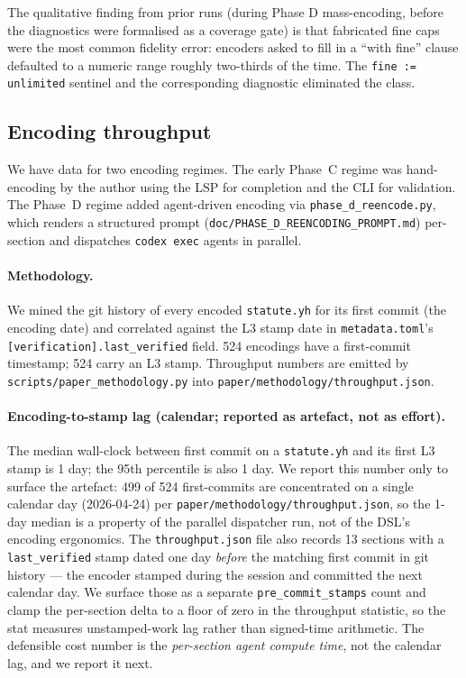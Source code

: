 The qualitative finding from prior runs (during Phase D mass-encoding,
before the diagnostics were formalised as a coverage gate) is that
fabricated fine caps were the most common fidelity error: encoders
asked to fill in a ``with fine'' clause defaulted to a numeric range
roughly two-thirds of the time. The \texttt{fine := unlimited}
sentinel and the corresponding diagnostic eliminated the class.

\subsection{Encoding throughput}
\label{subsec:throughput}

We have data for two encoding regimes. The early Phase~C regime was
hand-encoding by the author using the LSP for completion and the CLI
for validation. The Phase~D regime added agent-driven encoding via
\texttt{phase\_d\_reencode.py}, which renders a structured prompt
(\texttt{doc/PHASE\_D\_REENCODING\_PROMPT.md}) per-section and
dispatches \texttt{codex exec} agents in parallel.

\paragraph{Methodology.} We mined the git history of every encoded
\texttt{statute.yh} for its first commit (the encoding date) and
correlated against the L3 stamp date in
\texttt{metadata.toml}'s \texttt{[verification].last\_verified} field.
524 encodings have a first-commit timestamp; 524 carry an L3 stamp.
Throughput numbers are emitted by \texttt{scripts/paper\_methodology.py}
into \texttt{paper/methodology/throughput.json}.

\paragraph{Encoding-to-stamp lag (calendar; reported as artefact, not as
effort).} The median wall-clock between first commit on a
\texttt{statute.yh} and its first L3 stamp is 1 day; the 95th
percentile is also 1 day. We report this number only to surface the
artefact: 499 of 524 first-commits are concentrated on a single
calendar day (2026-04-24) per
\texttt{paper/methodology/throughput.json}, so the 1-day median is a
property of the parallel dispatcher run, not of the DSL's encoding
ergonomics. The \texttt{throughput.json} file also records 13 sections
with a \texttt{last\_verified} stamp dated one day \emph{before} the
matching first commit in git history --- the encoder stamped during
the session and committed the next calendar day. We surface those as
a separate \texttt{pre\_commit\_stamps} count and clamp the per-section
delta to a floor of zero in the throughput statistic, so the stat
measures unstamped-work lag rather than signed-time arithmetic.
The defensible cost number is the \emph{per-section agent compute
time}, not the calendar lag, and we report it next.


